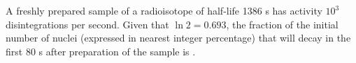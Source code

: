 

    \item A freshly prepared sample of a radioisotope of half-life 1386 s has activity \(10^3\) disintegrations per second. Given that \(\ln 2 = 0.693\), the fraction of the initial number of nuclei (expressed in nearest integer percentage) that will decay in the first 80 s after preparation of the sample is \underline{\hspace{2.5 cm}}.

